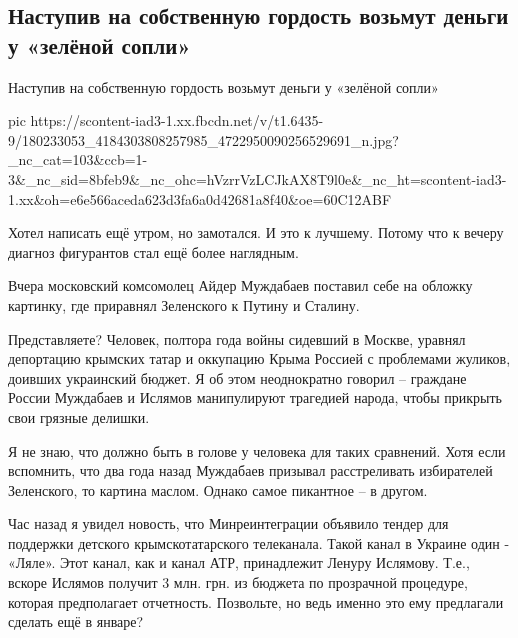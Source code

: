  
 
 
 
 

\subsection{Наступив на собственную гордость возьмут деньги у «зелёной сопли»}

Наступив на собственную гордость возьмут деньги у «зелёной сопли»


\ifcmt
  pic https://scontent-iad3-1.xx.fbcdn.net/v/t1.6435-9/180233053_4184303808257985_4722950090256529691_n.jpg?_nc_cat=103&ccb=1-3&_nc_sid=8bfeb9&_nc_ohc=hVzrrVzLCJkAX8T9l0e&_nc_ht=scontent-iad3-1.xx&oh=e6e566aceda623d3fa6a0d42681a8f40&oe=60C12ABF
\fi


Хотел написать ещё утром, но замотался. И это к лучшему. Потому что к вечеру
диагноз фигурантов стал ещё более наглядным.

Вчера московский комсомолец Айдер Муждабаев поставил себе на обложку картинку, где приравнял Зеленского к Путину и Сталину. 

Представляете? Человек, полтора года войны сидевший в Москве, уравнял
депортацию крымских татар и оккупацию Крыма Россией с проблемами жуликов,
доивших украинский бюджет. Я об этом неоднократно говорил – граждане России
Муждабаев и Ислямов манипулируют трагедией народа, чтобы прикрыть свои грязные
делишки.

Я не знаю, что должно быть в голове у человека для таких сравнений. Хотя если
вспомнить, что два года назад Муждабаев призывал расстреливать избирателей
Зеленского, то картина маслом. Однако самое пикантное – в другом.

Час назад я увидел новость, что Минреинтеграции объявило тендер для поддержки
детского крымскотатарского телеканала. Такой канал в Украине один - «Ляле».
Этот канал, как и канал АТР, принадлежит Ленуру Ислямову. Т.е., вскоре Ислямов
получит 3 млн. грн. из бюджета по прозрачной процедуре, которая предполагает
отчетность. Позвольте, но ведь именно это ему предлагали сделать ещё в январе? 

